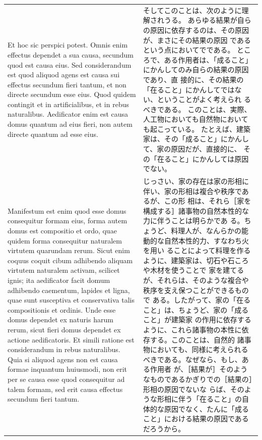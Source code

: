 \documentclass[paper=a4paper,fontsize=10pt,jafontsize=9pt,titlepage]{jlreq}
\begin{document}
\begin{longtable}{p{21em}p{21em}}
\\

Et hoc sic perspici potest. Omnis enim effectus
dependet a sua causa, secundum quod est causa eius. Sed considerandum
est quod aliquod agens est causa sui effectus secundum fieri tantum, et
non directe secundum esse eius. Quod quidem contingit et in
artificialibus, et in rebus naturalibus. Aedificator enim est causa
domus quantum ad eius fieri, non autem directe quantum ad esse
eius.



&

そしてこのことは、次のように理解されうる。
あらゆる結果が自らの原因に依存するのは、その原因が、まさにその結果の原因
 であるという点においてでである。
ところで、ある作用者は、「成ること」にかんしてのみ自らの結果の原因であり、直
 接的に、その結果の「在ること」にかんしてではない、ということがよく考えられ
 るべきである。
このことは、実際、人工物においても自然物においても起こっている。
たとえば、建築家は、その「成ること」にかんして、家の原因だが、直接的に、
 その「在ること」にかんしては原因でない。

\\


Manifestum est enim quod esse domus consequitur formam eius, forma
autem domus est compositio et ordo, quae quidem forma consequitur
naturalem virtutem quarundam rerum. Sicut enim coquus coquit cibum
adhibendo aliquam virtutem naturalem activam, scilicet ignis; ita
aedificator facit domum adhibendo caementum, lapides et ligna, quae sunt
susceptiva et conservativa talis compositionis et ordinis. Unde esse
domus dependet ex naturis harum rerum, sicut fieri domus dependet ex
actione aedificatoris. Et simili ratione est considerandum in rebus
naturalibus. Quia si aliquod agens non est causa formae inquantum
huiusmodi, non erit per se causa esse quod consequitur ad talem formam,
sed erit causa effectus secundum fieri tantum.



&

じっさい、家の存在は家の形相に伴い、家の形相は複合や秩序であるが、この形
 相は、それら［家を構成する］諸事物の自然本性的な力に伴うことは明らかであ
 る。ちょうど、料理人が、なんらかの能動的な自然本性的力、すなわち火を用い
 ることによって料理を作るように、建築家は、切石や石ころや木材を使うことで
 家を建てるが、それらは、そのような複合や秩序を支え保つことができるもので
 ある。したがって、家の「在ること」は、ちょうど、家の「成ること」が建築家
 の作用に依存するように、これら諸事物の本性に依存する。このことは、自然的
 諸事物においても、同様に考えられるべきである。なぜなら、もし、ある作用者
 が、［結果が］そのようなものであるかぎりでの［結果の］形相の原因でないな
 らば、そのような形相に伴う「在ること」の自体的な原因でなく、たんに「成る
 こと」における結果の原因であるだろうから。



\end{longtable}
\end{document}
